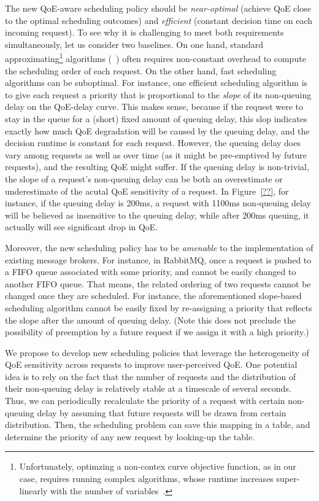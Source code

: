 The new QoE-aware scheduling policy should be {\em near-optimal} (\ie achieve QoE close to the optimal scheduling outcomes) and {\em efficient} (\ie constant decision time on each incoming request).
To see why it is challenging to meet both requirements simultaneously, let us consider two baselines.
On one hand, standard approximating\footnote{Unfortunately, optimzing a non-contex curve objective function, as in our case, requires running complex algorithms, whose runtime increases super-linearly with the number of variables~\cite{??}.} algorithms (\eg~\cite{??}) often requires non-constant overhead to compute the scheduling order of each request. 
On the other hand, fast scheduling algorithms can be suboptimal. 
For instance, one efficient scheduling algorithm is to give each request a priority that is proportional to the {\em slope} of its non-queuing delay on the QoE-delay curve. 
This makes sense, because if the request were to stay in the queue for a (short) fixed amount of queuing delay, this slop indicates exactly how much QoE degradation will be caused by the queuing delay, and the decision runtime is constant for each request.
However, the queuing delay does vary among requests as well as over time (as it might be pre-emptived by future requests), and the resulting QoE might suffer.
If the queuing delay is non-trivial, the slope of a request's non-queuing delay can be both an overestimate or underestimate of the acutal QoE sensitivity of a request. 
In Figure~\ref{??}, for instance, if the queuing delay is 200ms, a request with 1100ms non-queuing delay will be believed as insensitive to the queuing delay, while after 200ms queuing, it actually will see significant drop in QoE. 

Moreover, the new scheduling policy has to be {\em amenable} to the implementation of existing message brokers. 
For instance, in RabbitMQ, once a request is pushed to a FIFO queue associated with some priority, and cannot be easily changed to another FIFO queue. 
That means, the related ordering of two requests cannot be changed once they are scheduled.
For instance, the aforementioned slope-based scheduling algorithm cannot be easily fixed by re-assigning a priority that reflects the slope after the amount of queuing delay.
(Note this does not preclude the possibility of preemption by a future request if we assign it with a high priority.)

We propose to develop new scheduling policies that leverage the heterogeneity of QoE sensitivity across requests to improve user-perceived QoE. 
One potential idea is to rely on the fact that the number of requests and the distribution of their non-queuing delay is relatively stable at a timescale of several seconds. 
Thus, we can periodically recalculate the priority of a request with certain non-queuing delay by assuming that future requests will be drawn from certain distribution.
Then, the scheduling problem can save this mapping in a table, and determine the priority of any new request by looking-up the table. 


